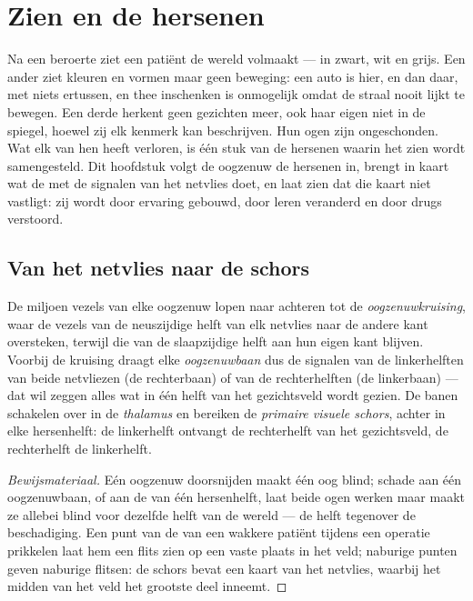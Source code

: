 \chapter{Zien en de hersenen}\label{ch:g11:vision-and-brain}

Na een beroerte ziet een patiënt de wereld volmaakt --- in zwart, wit en
grijs. Een ander ziet kleuren en vormen maar geen beweging: een auto is
hier, en dan daar, met niets ertussen, en thee inschenken is onmogelijk
omdat de straal nooit lijkt te bewegen. Een derde herkent geen gezichten
meer, ook haar eigen niet in de spiegel, hoewel zij elk kenmerk kan
beschrijven. Hun ogen zijn ongeschonden. Wat elk van hen heeft verloren,
is één stuk van de hersenen waarin het zien wordt samengesteld. Dit
hoofdstuk volgt de oogzenuw de hersenen in, brengt in kaart wat de
 met de signalen van het netvlies doet, en laat zien dat die
kaart niet vastligt: zij wordt door ervaring gebouwd, door leren veranderd
en door drugs verstoord.

\section{Van het netvlies naar de schors}

\begin{proposition}\label{prop:g11:vision-and-brain:pathway}
De miljoen vezels van elke oogzenuw lopen naar achteren tot de
\emph{oogzenuwkruising}, waar de vezels van de neuszijdige helft van elk
netvlies naar de andere kant oversteken, terwijl die van de slaapzijdige
helft aan hun eigen kant blijven. Voorbij de kruising draagt elke
\emph{oogzenuwbaan} dus de signalen van de linkerhelften van beide
netvliezen (de rechterbaan) of van de rechterhelften (de linkerbaan) ---
dat wil zeggen alles wat in één helft van het gezichtsveld wordt gezien.
De banen schakelen over in de \emph{thalamus} en bereiken de
\emph{primaire visuele schors}, achter in elke
hersenhelft: de linkerhelft ontvangt de rechterhelft van het
gezichtsveld, de rechterhelft de linkerhelft.
\end{proposition}
\begin{proof}[Bewijsmateriaal]
Eén oogzenuw doorsnijden maakt één oog blind; schade aan één
oogzenuwbaan, of aan de  van één hersenhelft, laat beide
ogen werken maar maakt ze allebei blind voor dezelfde helft van de wereld
--- de helft tegenover de beschadiging. Een punt van de 
van een wakkere patiënt tijdens een operatie prikkelen laat hem een flits
zien op een vaste plaats in het veld; naburige punten geven naburige
flitsen: de schors bevat een kaart van het netvlies, waarbij het midden
van het veld het grootste deel inneemt.
\end{proof}

